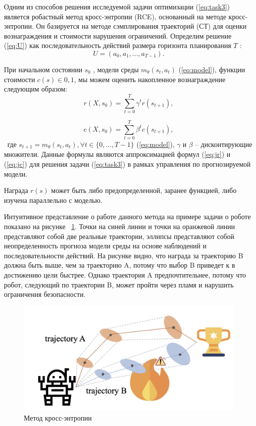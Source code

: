 Одним из способов решения исследуемой задачи оптимизации (\ref{eq:task3}) является робастный метод кросс-энтропии (RCE), основанный на методе кросс-энтропии. Он базируется на  методе сэмплирования траекторий (СТ)  \cite{cem1} для оценки вознаграждения и стоимости нарушения ограничений. Определим решение (\ref{eq:U}) как последовательность действий размера 
горизонта планирования $T$ :
 $$U = (a_0, a_1, ..., a_{T −1}).$$  
 
При начальном состоянии $s_0$ , модели среды $m_{\theta}(s_t, a_t)$ (\ref{eq:model}), функции стоимости  $c(s) \in {0, 1}$, мы можем оценить накопленное вознаграждение следующим образом:
\begin{equation}
	r(X, s_0) = \sum\limits_{t=0}^T \gamma^t r(s_{t+1}),
	\label{eq:r}
\end{equation}

\begin{equation}
	c(X, s_0) = \sum\limits_{t=0}^T \beta^t c(s_{t+1}),
	\label{eq:c}
\end{equation}
 где $s_{t+1} = m_{\theta}(s_t, a_t), \forall  t \in \{0, \dots, T-1\}$ (\ref{eq:model}), $\gamma$ и $\beta$ -- дисконтирующие множители. Данные формулы являются аппроксимацией формул (\ref{eq:jr}) и (\ref{eq:jc}) для решения задачи (\ref{eq:task3}) в рамках управления по прогнозируемой модели.

Награда $r(s)$ может быть либо предопределенной, заранее функцией, либо изучена параллельно с моделью.  

Интуитивное представление о работе данного метода на примере задачи о роботе показано на рисунке ~\ref{fig:cross-ent}. Точки на синей линии и точки на оранжевой линии представляют собой две реальные траектории, эллипсы
представляют собой неопределенность прогноза модели среды на основе наблюдений и последовательности действий. На рисунке видно, что награда за траекторию B должна быть выше, чем за траекторию A, потому что выбор B приведет к в достижению цели быстрее. Однако траектория A предпочтительнее, потому что робот, следующий по траектории B, может пройти
через пламя и нарушить ограничения безопасности.


\begin{figure}[h]
	\centering
	\includegraphics[scale=0.6]{cem_alg.png}	
	\caption {Метод кросс-энтропии}
	\label{fig:cross-ent}
\end{figure}


